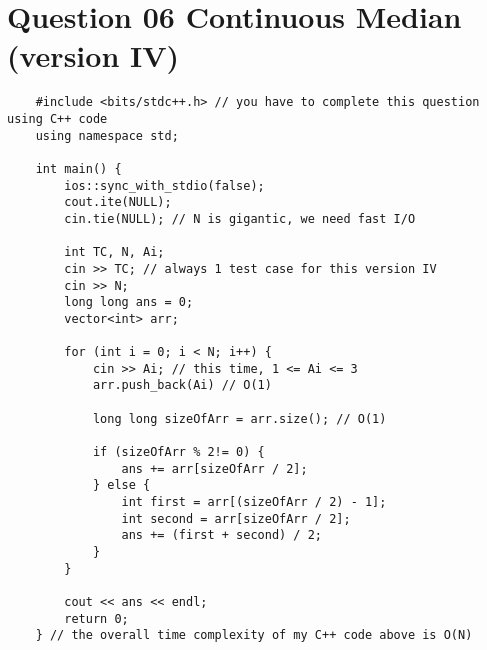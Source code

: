 \documentclass{article}
\begin{document}
\section{Question 06 Continuous Median (version IV)}

\begin{verbatim}
    #include <bits/stdc++.h> // you have to complete this question using C++ code
    using namespace std;
    
    int main() {
        ios::sync_with_stdio(false); 
        cout.ite(NULL);
        cin.tie(NULL); // N is gigantic, we need fast I/O
    
        int TC, N, Ai;
        cin >> TC; // always 1 test case for this version IV
        cin >> N;
        long long ans = 0;
        vector<int> arr;
        
        for (int i = 0; i < N; i++) {
            cin >> Ai; // this time, 1 <= Ai <= 3
            arr.push_back(Ai) // O(1)
            
            long long sizeOfArr = arr.size(); // O(1)
            
            if (sizeOfArr % 2!= 0) {
                ans += arr[sizeOfArr / 2];
            } else {
                int first = arr[(sizeOfArr / 2) - 1];
                int second = arr[sizeOfArr / 2];
                ans += (first + second) / 2;
            }
        }
        
        cout << ans << endl;
        return 0;
    } // the overall time complexity of my C++ code above is O(N)
\end{verbatim}
\end{document}
